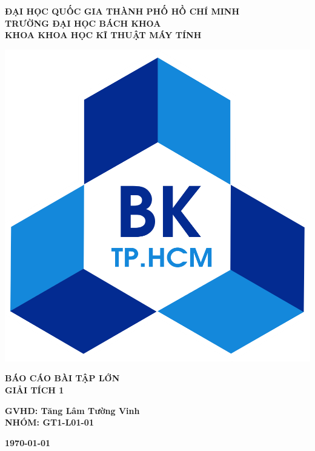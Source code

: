 \begin{titlepage}
\begin{center}
{\Large\bf  ĐẠI HỌC QUỐC GIA THÀNH PHỐ HỒ CHÍ MINH}\\[4pt]
{\Large\bf TRƯỜNG ĐẠI HỌC BÁCH KHOA}\\[4pt]
{\Large\bf KHOA KHOA HỌC KĨ THUẬT MÁY TÍNH}\\
\hfill

\vspace*{1cm}

\begin{center}
	\includegraphics*[scale=0.2]{pic/logo}
\end{center}

\vspace*{1cm}

{\Huge\bf \color{red} BÁO CÁO BÀI TẬP LỚN\\
	GIẢI TÍCH 1
}

\vspace*{4cm}

{\LARGE\bf\color{blue} GVHD: Tăng Lâm Tường Vinh}\\[10pt]
{\LARGE\bf \color{blue} NHÓM: GT1-L01-01}\\


\vfill

{\bf \today}
\end{center}
\end{titlepage}
\newpage

